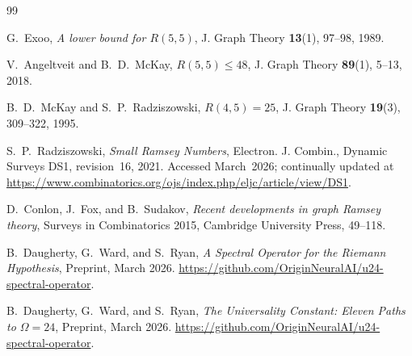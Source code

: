 \documentclass[11pt,a4paper]{article}
\theoremstyle{plain}
\theoremstyle{remark}
\begin{document}
\begin{thebibliography}{99}

G.~Exoo,
\emph{A lower bound for $R(5,5)$},
J. Graph Theory \textbf{13}(1), 97--98, 1989.

V.~Angeltveit and B.~D.~McKay,
\emph{$R(5,5) \leq 48$},
J. Graph Theory \textbf{89}(1), 5--13, 2018.

B.~D.~McKay and S.~P.~Radziszowski,
\emph{$R(4,5) = 25$},
J. Graph Theory \textbf{19}(3), 309--322, 1995.

S.~P.~Radziszowski,
\emph{Small Ramsey Numbers},
Electron. J. Combin., Dynamic Surveys DS1, revision~16, 2021.
Accessed March~2026; continually updated at
\url{https://www.combinatorics.org/ojs/index.php/eljc/article/view/DS1}.

D.~Conlon, J.~Fox, and B.~Sudakov,
\emph{Recent developments in graph Ramsey theory},
Surveys in Combinatorics 2015, Cambridge University Press, 49--118.

B.~Daugherty, G.~Ward, and S.~Ryan,
\emph{A Spectral Operator for the Riemann Hypothesis},
Preprint, March 2026.
\url{https://github.com/OriginNeuralAI/u24-spectral-operator}.

B.~Daugherty, G.~Ward, and S.~Ryan,
\emph{The Universality Constant: Eleven Paths to $\Omega = 24$},
Preprint, March 2026.
\url{https://github.com/OriginNeuralAI/u24-spectral-operator}.

\end{thebibliography}
\end{document}
